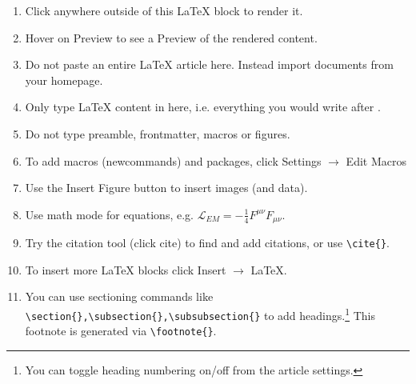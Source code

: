 \begin{enumerate}
\item Click anywhere outside of this LaTeX block to render it.
\item Hover on Preview to see a Preview of the rendered content.
\item Do not paste an entire LaTeX article here. Instead import documents from your homepage.
\item Only type LaTeX content in here, i.e. everything you would write after \verb||.
\item Do not type preamble, frontmatter, macros or figures.
\item To add macros (newcommands) and packages, click Settings $\rightarrow$ Edit Macros
\item Use the Insert Figure button to insert images (and data).
\item Use math mode for equations, e.g. $\mathcal L_{EM}=-\frac14F^{\mu\nu}F_{\mu\nu}$.
\item Try the citation tool (click cite) to find and add citations, or use \verb|\cite{}|.
\item To insert more LaTeX blocks click Insert $\rightarrow$ LaTeX.
\item You can use sectioning commands like \verb|\section{},\subsection{},\subsubsection{}| to add headings.\footnote{You can toggle heading numbering on/off from the article settings.} This footnote is generated via \verb|\footnote{}|.
\end{enumerate}